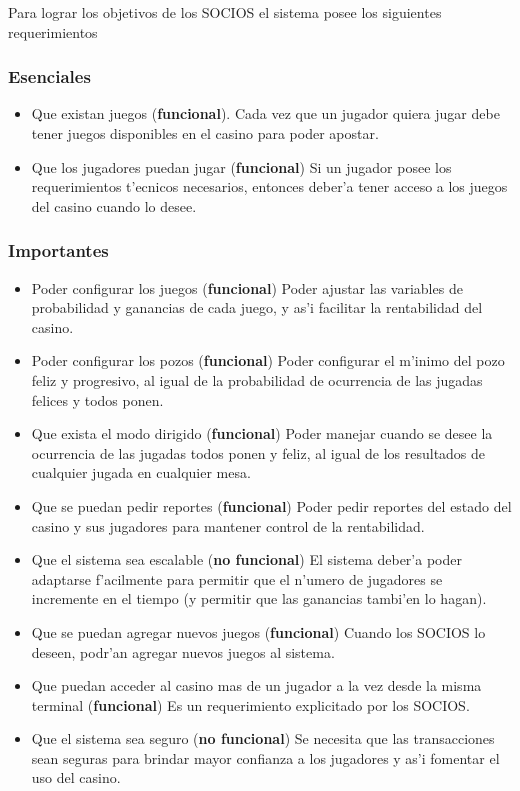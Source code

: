 Para lograr los objetivos de los SOCIOS el sistema posee los siguientes requerimientos

\subsubsection{Esenciales}
\begin{itemize}
    \item Que existan juegos (\textbf{funcional}). Cada vez que un jugador quiera jugar debe tener juegos disponibles en el casino para poder apostar.
    \item Que los jugadores puedan jugar (\textbf{funcional}) Si un jugador posee los requerimientos t'ecnicos necesarios, entonces deber'a tener acceso a los juegos del casino cuando lo desee.
\end{itemize}


\subsubsection{Importantes}
\begin{itemize}
    \item Poder configurar los juegos (\textbf{funcional}) Poder ajustar las variables de probabilidad y ganancias de cada juego, y as'i facilitar la rentabilidad del casino.
    \item Poder configurar los pozos (\textbf{funcional}) Poder configurar el m'inimo del pozo feliz y progresivo, al igual de la probabilidad de ocurrencia de las jugadas felices y todos ponen.
    \item Que exista el modo dirigido (\textbf{funcional}) Poder manejar cuando se desee la ocurrencia de las jugadas todos ponen y feliz, al igual de los resultados de cualquier jugada en cualquier mesa.
    \item Que se puedan pedir reportes (\textbf{funcional}) Poder pedir reportes del estado del casino y sus jugadores para mantener control de la rentabilidad.
    \item Que el sistema sea escalable (\textbf{no funcional}) El sistema deber'a poder adaptarse f'acilmente para permitir que el n'umero de jugadores se incremente en el tiempo (y permitir que las ganancias tambi'en lo hagan).
    \item Que se puedan agregar nuevos juegos (\textbf{funcional}) Cuando los SOCIOS lo deseen, podr'an agregar nuevos juegos al sistema.
    \item Que puedan acceder al casino mas de un jugador a la vez desde la misma terminal (\textbf{funcional}) Es un requerimiento explicitado por los SOCIOS.
    \item Que el sistema sea seguro (\textbf{no funcional}) Se necesita que las transacciones sean seguras para brindar mayor confianza a los jugadores y as'i fomentar el uso del casino.
\end{itemize}

